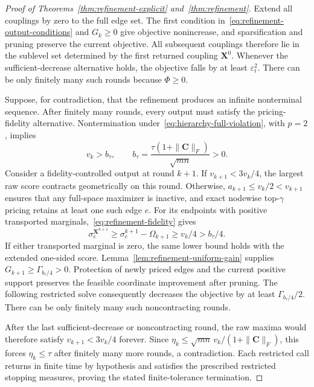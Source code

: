 \begin{proof}[Proof of Theorems~\ref{thm:refinement-explicit} and~\ref{thm:refinement}]
Extend all couplings by zero to the full edge set.
The first condition in~\eqref{eq:refinement-output-conditions} and $G_k\geq0$ give objective nonincrease, and sparsification and pruning preserve the current objective.
All subsequent couplings therefore lie in the sublevel set determined by the first returned coupling $\mathbf X^0$.
Whenever the sufficient-decrease alternative holds, the objective falls by at least $\varepsilon_{\mathrm r}^2$.
There can be only finitely many such rounds because $\Phi\geq0$.

Suppose, for contradiction, that the refinement produces an infinite nonterminal sequence.
After finitely many rounds, every output must satisfy the pricing-fidelity alternative.
Nontermination under~\eqref{eq:hierarchy-full-violation}, with $p=2$, implies
\begin{equation*}
v_k>b_\tau,\qquad b_\tau=\frac{\tau(1+\|\mathbf C\|_F)}{\sqrt{mn}}>0.
\end{equation*}
Consider a fidelity-controlled output at round $k+1$.
If $v_{k+1}<3v_k/4$, the largest raw score contracts geometrically on this round.
Otherwise, $a_{k+1}\leq v_k/2<v_{k+1}$ ensures that any full-space maximizer is inactive, and exact nodewise top-$\gamma$ pricing retains at least one such edge $e$.
For its endpoints with positive transported marginals,~\eqref{eq:refinement-fidelity} gives
\begin{equation*}
\sigma_e^{\mathbf X^{k+1}}\geq\sigma_e^{k+1}-\Omega_{k+1}\geq v_k/4>b_\tau/4.
\end{equation*}
If either transported marginal is zero, the same lower bound holds with the extended one-sided score.
Lemma~\ref{lem:refinement-uniform-gain} supplies $G_{k+1}\geq\Gamma_{b_\tau/4}>0$.
Protection of newly priced edges and the current positive support preserves the feasible coordinate improvement after pruning.
The following restricted solve consequently decreases the objective by at least $\Gamma_{b_\tau/4}/2$.
There can be only finitely many such noncontracting rounds.

After the last sufficient-decrease or noncontracting round, the raw maxima would therefore satisfy $v_{k+1}<3v_k/4$ forever.
Since $\eta_k\leq\sqrt{mn}\,v_k/(1+\|\mathbf C\|_F)$, this forces $\eta_k\leq\tau$ after finitely many more rounds, a contradiction.
Each restricted call returns in finite time by hypothesis and satisfies the prescribed restricted stopping measures, proving the stated finite-tolerance termination.
\end{proof}

